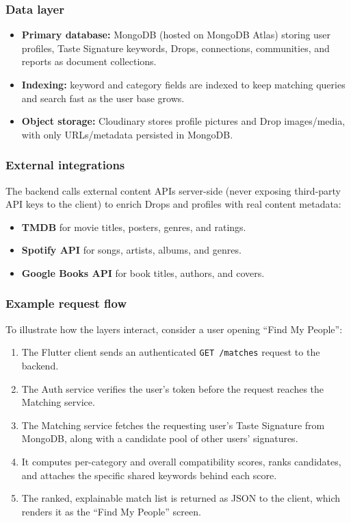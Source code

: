 \documentclass[11pt,a4paper]{article}
\begin{document}
\subsubsection*{Data layer}
\begin{itemize}[leftmargin=0.7cm]
    \item \textbf{Primary database:} MongoDB (hosted on MongoDB Atlas) storing user profiles, Taste Signature keywords, Drops, connections, communities, and reports as document collections.
    \item \textbf{Indexing:} keyword and category fields are indexed to keep matching queries and search fast as the user base grows.
    \item \textbf{Object storage:} Cloudinary stores profile pictures and Drop images/media, with only URLs/metadata persisted in MongoDB.
\end{itemize}

\subsubsection*{External integrations}
The backend calls external content APIs server-side (never exposing third-party API keys to the
client) to enrich Drops and profiles with real content metadata:
\begin{itemize}[leftmargin=0.7cm]
    \item \textbf{TMDB} for movie titles, posters, genres, and ratings.
    \item \textbf{Spotify API} for songs, artists, albums, and genres.
    \item \textbf{Google Books API} for book titles, authors, and covers.
\end{itemize}

\subsubsection*{Example request flow}
To illustrate how the layers interact, consider a user opening ``Find My People'':
\begin{enumerate}[leftmargin=0.7cm]
    \item The Flutter client sends an authenticated \texttt{GET /matches} request to the backend.
    \item The Auth service verifies the user's token before the request reaches the Matching service.
    \item The Matching service fetches the requesting user's Taste Signature from MongoDB, along with a candidate pool of other users' signatures.
    \item It computes per-category and overall compatibility scores, ranks candidates, and attaches the specific shared keywords behind each score.
    \item The ranked, explainable match list is returned as JSON to the client, which renders it as the ``Find My People'' screen.
\end{enumerate}
\end{document}
